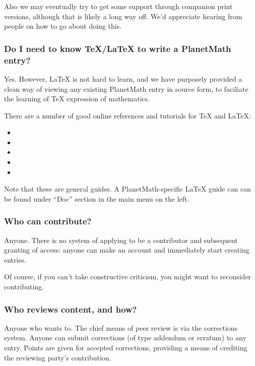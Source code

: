 Also we may eventually try to get some support through companion print versions, although that is likely a long way off. We'd appreciate hearing from people on how to go about doing this.

\subsubsection*{Do I need to know \TeX/\LaTeX{} to write a PlanetMath entry?}
Yes. However, \LaTeX{} is not hard to learn, and we have purposely provided a clean way of viewing any existing PlanetMath entry in source form, to faciliate the learning of \TeX{} expression of mathematics.

There are a number of good online references and tutorials for TeX and LaTeX:
\begin{itemize}
\item {}
\item {}
\item {}
\item {}
\item {}
\end{itemize}
Note that these are general guides. A PlanetMath-specific \LaTeX{} guide can can be found under ``Doc'' section in the main menu on the left.

\subsubsection*{Who can contribute?}
Anyone. There is no system of applying to be a contributor and subsequent granting of access: anyone can make an account and immediately start creating entries.

Of course, if you can't take constructive criticism, you might want to reconsider contributing.

\subsubsection*{Who reviews content, and how?}
Anyone who wants to. The chief means of peer review is via the corrections system. Anyone can submit corrections (of type addendum or erratum) to any entry. Points are given for accepted corrections, providing a means of crediting the reviewing party's contribution.

